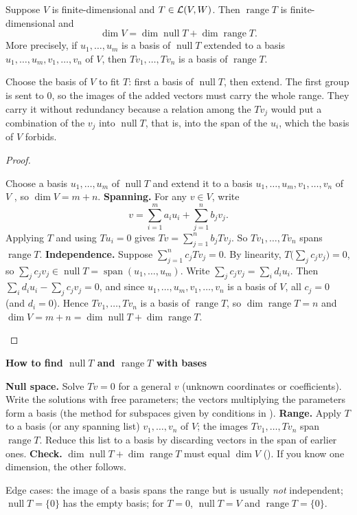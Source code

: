 \documentclass[10pt]{scrartcl}
\DeclareMathOperator{\spn}{span}\DeclareMathOperator{\nul}{null}\DeclareMathOperator{\range}{range}
\newenvironment{methodbox}[1]{\begin{mdframed}[style=methodstyle]\textbf{\color{NavyBlue}#1}\par\vspace{2pt}}{\end{mdframed}}
\begin{document}
\begin{theorem*}
  Suppose $V$ is finite-dimensional and $T\in\mathcal L(V,W)$. Then $\range T$ is finite-dimensional and
  \[
    \dim V = \dim\nul T + \dim\range T.
  \]
  More precisely, if $u_1,\dots,u_m$ is a basis of $\nul T$ extended to a basis $u_1,\dots,u_m,v_1,\dots,v_n$ of $V$, then $Tv_1,\dots,Tv_n$ is a basis of $\range T$.
\end{theorem*}
\begin{ideabox}
  Choose the basis of $V$ to fit $T$: first a basis of $\nul T$, then extend. The first group is sent to $0$, so the images of the added vectors must carry the whole range. They carry it without redundancy because a relation among the $Tv_j$ would put a combination of the $v_j$ into $\nul T$, that is, into the span of the $u_i$, which the basis of $V$ forbids.
\end{ideabox}
\begin{proof}
  \begin{steps}
    \ii Choose a basis $u_1,\dots,u_m$ of $\nul T$ and extend it to a basis $u_1,\dots,u_m,v_1,\dots,v_n$ of $V$ , so $\dim V=m+n$.
    \ii \textbf{Spanning.} For any $v\in V$, write
    \[
      v=\sum_{i=1}^m a_iu_i+\sum_{j=1}^n b_jv_j .
    \]
    Applying $T$ and using $Tu_i=0$ gives $Tv=\sum_{j=1}^n b_jTv_j$. So $Tv_1,\dots,Tv_n$ spans $\range T$.
    \ii \textbf{Independence.} Suppose $\sum_{j=1}^n c_jTv_j=0$. By linearity, $T\big(\sum_j c_jv_j\big)=0$, so $\sum_j c_jv_j\in\nul T=\spn(u_1,\dots,u_m)$.
    \ii Write $\sum_j c_jv_j=\sum_i d_iu_i$. Then $\sum_i d_iu_i-\sum_j c_jv_j=0$, and since $u_1,\dots,u_m,v_1,\dots,v_n$ is a basis of $V$, all $c_j=0$ (and $d_i=0$).
    \ii Hence $Tv_1,\dots,Tv_n$ is a basis of $\range T$, so $\dim\range T=n$ and $\dim V=m+n=\dim\nul T+\dim\range T$.
  \end{steps}
\end{proof}

\begin{methodbox}{How to find $\nul T$ and $\range T$ with bases}
  \begin{steps}
    \ii \textbf{Null space.} Solve $Tv=0$ for a general $v$ (unknown coordinates or coefficients). Write the solutions with free parameters; the vectors multiplying the parameters form a basis (the method for subspaces given by conditions in ).
    \ii \textbf{Range.} Apply $T$ to a basis (or any spanning list) $v_1,\dots,v_n$ of $V$; the images $Tv_1,\dots,Tv_n$ span $\range T$. Reduce this list to a basis by discarding vectors in the span of earlier ones.
    \ii \textbf{Check.} $\dim\nul T+\dim\range T$ must equal $\dim V$ (). If you know one dimension, the other follows.
  \end{steps}
  Edge cases: the image of a basis spans the range but is usually \emph{not} independent; $\nul T=\{0\}$ has the empty basis; for $T=0$, $\nul T=V$ and $\range T=\{0\}$.
\end{methodbox}
\end{document}

